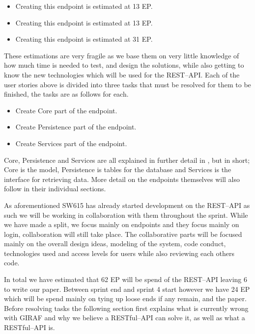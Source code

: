 \begin{itemize}[style=unboxed]
	\item {}
	Creating this endpoint is estimated at 13 EP.
	\item {}
	Creating this endpoint is estimated at 13 EP.
	\item {}
	Creating this endpoint is estimated at 31 EP.
\end{itemize}
These estimations are very fragile as we base them on very little knowledge of how much time is needed to test, and design the solutions, while also getting to know the new technologies which will be used for the REST--API.
Each of the user stories above is divided into three tasks that must be resolved for them to be finished, the tasks are as follows for each.
\begin{itemize}
    \item Create Core part of the endpoint.
    \item Create Persistence part of the endpoint.
    \item Create Services part of the endpoint.
\end{itemize}
Core, Persistence and Services are all explained in further detail in \myref{}, but in short; Core is the model, Persistence is tables for the database and Services is the interface for retrieving data.
More detail on the endpoints themselves will also follow in their individual sections.

As aforementioned SW615 has already started development on the REST--API as such we will be working in collaboration with them throughout the sprint.
While we have made a split, we focus mainly on endpoints and they focus mainly on login, collaboration will still take place.
The collaborative parts will be focused mainly on the overall design ideas, modeling of the system, code conduct, technologies used and access levels for users while also reviewing each others code.

In total we have estimated that 62 EP will be spend of the REST--API leaving 6 to write our paper.
Between sprint end and sprint 4 start however we have 24 EP which will be spend mainly on tying up loose ends if any remain, and the paper.
Before resolving tasks the following section first explains what is currently wrong with GIRAF and why we believe a RESTful--API can solve it, as well as what a RESTful--API is.